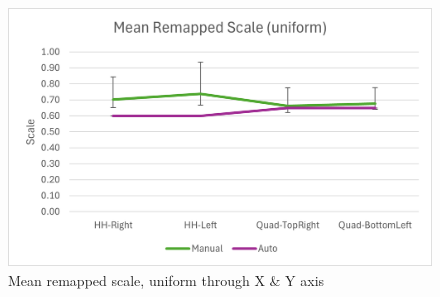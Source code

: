 \documentclass{l4proj}
\begin{document}
\begin{figure}[!h]
    \centering
    \includegraphics[width=\textwidth]{images/MeanRemappedScale.png}
    \caption{Mean remapped scale, uniform through X \& Y axis}
    \label{fig:meanRemappedScale}
\end{figure}




\end{document}
